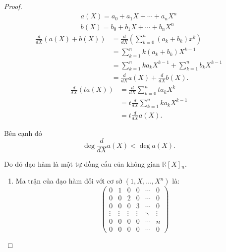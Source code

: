 \documentclass[class=linearalgebra,crop=false]{standalone}
\begin{document}
\begin{proof}
    \[
        \begin{split}
            a(X) = a_{0} + a_{1}X + \cdots + a_{n}X^{n} \\
            b(X) = b_{0} + b_{1}X + \cdots + b_{n}X^{n}
        \end{split}
    \]
    \begin{align*}
        \frac{d}{dX}(a(X) + b(X)) & = \frac{d}{dX}\left(\sum^{n}_{k=0}(a_{k}+b_{k})x^{k}\right) \\
                                  & = \sum^{n}_{k=1}k(a_{k}+b_{k})X^{k-1}                       \\
                                  & = \sum^{n}_{k=1}ka_{k}X^{k-1} + \sum^{n}_{k=1}b_{k}X^{k-1}  \\
                                  & = \frac{d}{dX}a(X) + \frac{d}{dX}b(X).
    \end{align*}
    \begin{align*}
        \frac{d}{dX}(ta(X)) & = \frac{d}{dX}\sum^{n}_{k=0}ta_{k}X^{k}    \\
                            & = t\frac{d}{dX}\sum^{n}_{k=1}ka_{k}X^{k-1} \\
                            & = t\frac{d}{dX}a(X).
    \end{align*}
    \par Bên cạnh đó
    \[
        \deg \frac{d}{dX}a(X) < \deg a(X).
    \]
    \par Do đó đạo hàm là một tự đồng cấu của không gian $\mathbb{R}[X]{}_{n}$.
    \begin{enumerate}[label = (\alph*)]
        \item Ma trận của đạo hàm đối với cơ sở $(1, X, \ldots, X^{n})$ là:
              \[
                  \begin{pmatrix}
                      0      & 1      & 0      & 0      & \cdots & 0      \\
                      0      & 0      & 2      & 0      & \cdots & 0      \\
                      0      & 0      & 0      & 3      & \cdots & 0      \\
                      \vdots & \vdots & \vdots & \vdots & \ddots & \vdots \\
                      0      & 0      & 0      & 0      & \cdots & n      \\
                      0      & 0      & 0      & 0      & \cdots & 0
                  \end{pmatrix}
\]
\end{enumerate}
\end{proof}
\end{document}
